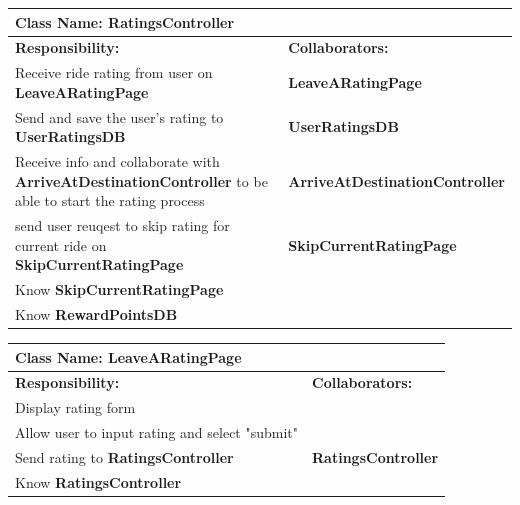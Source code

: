 \documentclass[]{article}
\begin{document}
\begin{table}[H]
    \centering
    \begin{tabular}{|p{5cm}|p{5cm}|}
    \hline
    \multicolumn{2}{|l|}{\textbf{Class Name:} RatingsController} \\
    \hline
    \textbf{Responsibility:} & \textbf{Collaborators:} \\
    \hline
    Receive ride rating from user on \textbf{LeaveARatingPage} & \textbf{LeaveARatingPage} \\
    \hline
    Send and save the user's rating to \textbf{UserRatingsDB} & \textbf{UserRatingsDB} \\
    \hline
    Receive info and collaborate with \textbf{ArriveAtDestinationController} to be able to start the rating process & \textbf{ArriveAtDestinationController} \\ 
    \hline
    send user reuqest to skip rating for current ride on \textbf{SkipCurrentRatingPage} & \textbf{SkipCurrentRatingPage} \\
    \hline
    Know \textbf{SkipCurrentRatingPage}  & \phantom{} \\
    \hline
    Know \textbf{RewardPointsDB}  & \phantom{} \\
    \hline
    \end{tabular}
\end{table}

\begin{table}[H]
    \centering
    \begin{tabular}{|p{5cm}|p{5cm}|}
    \hline
    \multicolumn{2}{|l|}{\textbf{Class Name:} LeaveARatingPage} \\
    \hline
    \textbf{Responsibility:} & \textbf{Collaborators:} \\
    \hline
    Display rating form & \phantom{} \\
    \hline
    Allow user to input rating and select "submit" & \phantom{} \\
    \hline
    Send rating to \textbf{RatingsController} & \textbf{RatingsController} \\
    \hline
    Know \textbf{RatingsController}  & \phantom{} \\
    \hline
    \end{tabular}
\end{table}
\end{document}
